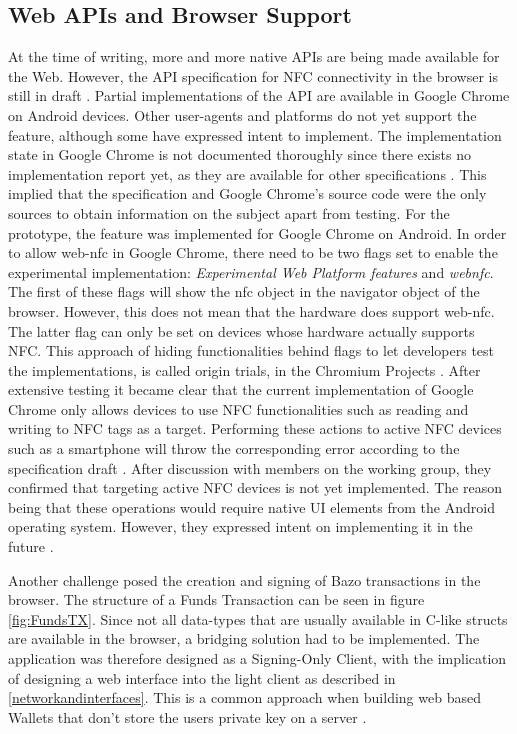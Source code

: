\subsection{Web APIs and Browser Support}\label{browsersupport}
At the time of writing, more and more native APIs are being made available for the Web.
However, the API specification for NFC connectivity in the browser is still in draft \cite{webnfc}. Partial implementations of the API are available in Google Chrome on Android devices. Other user-agents and platforms do not yet support the feature, although some have expressed intent to implement. The implementation state in Google Chrome is not documented thoroughly since there exists no implementation report yet, as they are available for other specifications \cite{localstoragetest}\cite{webnfc}. This implied that the specification and Google Chrome's source code were the only sources to obtain information on the subject apart from testing.
For the prototype, the feature was implemented for Google Chrome on Android.
In order to allow web-nfc in Google Chrome, there need to be two flags set to enable the experimental implementation: \textit{Experimental Web Platform features} and \textit{webnfc}. The first of these flags will show the nfc object in the navigator object of the browser. However, this does not mean that the hardware does support web-nfc. The latter flag can only be set on devices whose hardware actually supports NFC. This approach of hiding functionalities behind flags to let developers test the implementations, is called origin trials, in the Chromium Projects \cite{origintrials}.
After extensive testing it became clear that the current implementation of Google Chrome only allows devices to use NFC functionalities such as reading and writing to NFC tags as a target. Performing these actions to active NFC devices such as a smartphone will throw the corresponding error according to the specification draft \cite{webnfc}. After discussion with members on the working group, they confirmed that targeting active NFC devices is not yet implemented. The reason being that these operations would require native UI elements from the Android operating system. However, they expressed intent on implementing it in the future \cite{webnfcpeer}.

Another challenge posed the creation and signing of Bazo transactions in the browser. The structure of a Funds Transaction can be seen in figure \ref{fig:FundsTX}. Since not all data-types that are usually available in C-like structs are available in the browser, a bridging solution had to be implemented. The application was therefore designed as a Signing-Only Client, with the implication of designing a web interface into the light client as described in \ref{networkandinterfaces}. This is a common approach when building web based Wallets that don't store the users private key on a server \cite{bitcoinclients}\cite{masteringbitcoin}.

